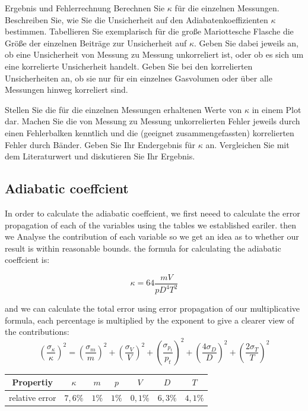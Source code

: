 \begin{aufgabe}{Ergebnis und Fehlerrechnung}
  Berechnen Sie $\kappa$ für die einzelnen Messungen. Beschreiben
  Sie, wie Sie die Unsicherheit auf den Adiabatenkoeffizienten
  $\kappa$ bestimmen. Tabellieren Sie exemplarisch für die große
  Mariottesche Flasche die Größe der einzelnen Beiträge zur
  Unsicherheit auf $\kappa$. Geben Sie dabei jeweils an, ob eine
  Unsicherheit von Messung zu Messung unkorreliert ist, oder ob es
  sich um eine korrelierte Unsicherheit handelt. Geben Sie bei den
  korrelierten Unsicherheiten an, ob sie nur für ein einzelnes
  Gasvolumen oder über alle Messungen hinweg korreliert sind.
  
  Stellen Sie die für die einzelnen Messungen erhaltenen Werte von
  $\kappa$ in einem Plot dar. Machen Sie die von Messung zu Messung
  unkorrelierten Fehler jeweils durch einen Fehlerbalken kenntlich und
  die (geeignet zusammengefassten) korrelierten Fehler durch
  Bänder. Geben Sie Ihr Endergebnis für $\kappa$ an. Vergleichen Sie
  mit dem Literaturwert und diskutieren Sie Ihr Ergebnis.
\end{aufgabe}



\subsection{Adiabatic coeffcient}

In order to calculate the adiabatic coeffcient, we first neeed to calculate the error propagation of each of the variables using the tables we established eariler. then we Analyse the contribution of each variable so we get an idea as to whether our result is within reasonable bounds. the formula for calculating the adiabatic coeffcient is:


$$
\kappa  =  64 \frac{mV}{p D^{4}T^{2}}
$$

and we can calculate the total error using error propagation of our multiplicative formula, each percentage is multiplied by the exponent to give a clearer view of the contributions:
$$
\left( \frac{\sigma _{\kappa}}{\kappa} \right)^{2}  = \left( \frac{\sigma _{m}}{m} \right)^{2} + \left(  \frac{\sigma _{V}}{V} \right) ^{2} + \left( \frac{\sigma _{p_t}}{p_t} \right)^{2} +\left( \frac{4\sigma _{D}}{D} \right)^{2} + \left( \frac{2\sigma _{T}}{T} \right)^{2}
$$



\begin{table}[H]
\begin{tabular}{c|cccccc}
Propertiy & $\kappa$ & $m$ & $p$ & $V$ & $D$ & $T$     \\ \hline 
relative error & $7,6\%$ & $1\%$ & $1\%$ & $0,1\%$ & $6,3\%$  & $4,1\%$ \\ \hline
\end{tabular}
\end{table}

